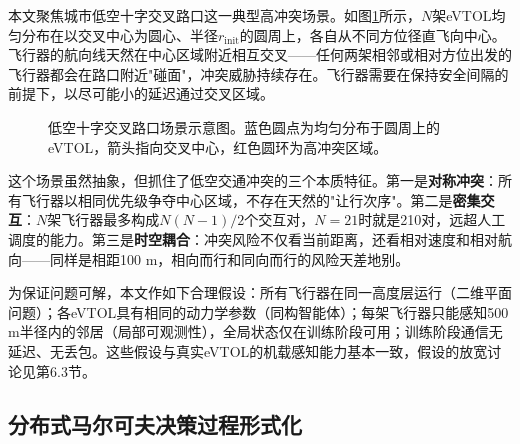 \documentclass[12pt,a4paper,UTF8]{ctexart}
\begin{document}
本文聚焦城市低空十字交叉路口这一典型高冲突场景。如图\ref{fig:scenario}所示，$N$架eVTOL均匀分布在以交叉中心为圆心、半径$r_{\text{init}}$的圆周上，各自从不同方位径直飞向中心。飞行器的航向线天然在中心区域附近相互交叉——任何两架相邻或相对方位出发的飞行器都会在路口附近"碰面"，冲突威胁持续存在。飞行器需要在保持安全间隔的前提下，以尽可能小的延迟通过交叉区域。

\begin{figure}[H]
    \centering
    \begin{minipage}[c]{0.7\textwidth}
    \centering
    \end{minipage}
    \caption{低空十字交叉路口场景示意图。蓝色圆点为均匀分布于圆周上的eVTOL，箭头指向交叉中心，红色圆环为高冲突区域。}
    \label{fig:scenario}
\end{figure}

这个场景虽然抽象，但抓住了低空交通冲突的三个本质特征。第一是\textbf{对称冲突}：所有飞行器以相同优先级争夺中心区域，不存在天然的"让行次序"。第二是\textbf{密集交互}：$N$架飞行器最多构成$N(N-1)/2$个交互对，$N=21$时就是210对，远超人工调度的能力。第三是\textbf{时空耦合}：冲突风险不仅看当前距离，还看相对速度和相对航向——同样是相距100 m，相向而行和同向而行的风险天差地别。

为保证问题可解，本文作如下合理假设：所有飞行器在同一高度层运行（二维平面问题）；各eVTOL具有相同的动力学参数（同构智能体）；每架飞行器只能感知500 m半径内的邻居（局部可观测性），全局状态仅在训练阶段可用；训练阶段通信无延迟、无丢包。这些假设与真实eVTOL的机载感知能力基本一致，假设的放宽讨论见第6.3节。

\subsection{分布式马尔可夫决策过程形式化}
\end{document}
